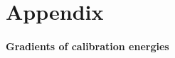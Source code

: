 \section{Appendix}
\paragraph{Gradients of calibration energies}
\label{app:gradients}

\endinput

% 


% 

